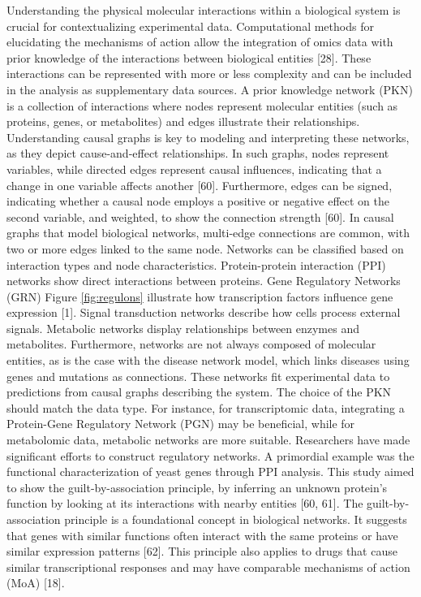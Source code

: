 Understanding the physical molecular interactions within a biological system is crucial for contextualizing experimental data. Computational methods for elucidating the mechanisms of action allow the integration of omics data with prior knowledge of the interactions between biological entities [28].  These interactions can be represented with more or less complexity and can be included in the analysis as supplementary data sources. A prior knowledge network (PKN) is a collection of interactions where nodes represent molecular entities (such as proteins, genes, or metabolites) and edges illustrate their relationships. Understanding causal graphs is key to modeling and interpreting these networks, as they depict cause-and-effect relationships. In such graphs, nodes represent variables, while directed edges represent causal influences, indicating that a change in one variable affects another [60]. Furthermore, edges can be signed, indicating whether a causal node employs a positive or negative effect on the second variable, and weighted, to show the connection strength [60]. In causal graphs that model biological networks, multi-edge connections are common, with two or more edges linked to the same node. 
Networks can be classified based on interaction types and node characteristics. Protein-protein interaction (PPI) networks show direct interactions between proteins. Gene Regulatory Networks (GRN) Figure \ref{fig:regulons} illustrate how transcription factors influence gene expression [1]. Signal transduction networks describe how cells process external signals. Metabolic networks display relationships between enzymes and metabolites. Furthermore, networks are not always composed of molecular entities, as is the case with the disease network model, which links diseases using genes and mutations as connections. These networks fit experimental data to predictions from causal graphs describing the system. The choice of the PKN should match the data type. For instance, for transcriptomic data, integrating a Protein-Gene Regulatory Network (PGN) may be beneficial, while for metabolomic data, metabolic networks are more suitable. Researchers have made significant efforts to construct regulatory networks. A primordial example was the functional characterization of yeast genes through PPI analysis. This study aimed to show the guilt-by-association principle, by inferring an unknown protein's function by looking at its interactions with nearby entities [60, 61]. The guilt-by-association principle is a foundational concept in biological networks. It suggests that genes with similar functions often interact with the same proteins or have similar expression patterns [62]. This principle also applies to drugs that cause similar transcriptional responses and may have comparable mechanisms of action (MoA) [18].
